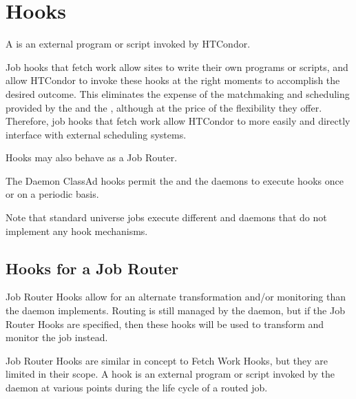 \section{Hooks}\label{sec:hooks}
A  is an external program or script invoked by HTCondor.

Job hooks that fetch work allow sites to write their own programs or scripts, 
and allow HTCondor to invoke these hooks at the right moments 
to accomplish the desired outcome.
This eliminates the expense of the matchmaking and scheduling provided 
by the  and the ,
although at the price of the flexibility they offer. 
Therefore, job hooks that fetch work allow HTCondor to more easily and directly
interface with external scheduling systems. 

Hooks may also behave as a Job Router.

The Daemon ClassAd hooks permit the  and 
the  daemons to execute hooks once or on a periodic basis.

Note that standard universe jobs execute different  and
 daemons that do not implement any hook mechanisms.




\subsection{\label{sec:job-hooks-JR-overview}
Hooks for a Job Router}

Job Router Hooks allow for an alternate transformation and/or 
monitoring than the  daemon implements.
Routing is still managed by the  daemon,
but if the Job Router Hooks are specified,
then these hooks will be used to transform
and monitor the job instead.

Job Router Hooks are similar in concept to Fetch Work Hooks,
but they are limited in their scope.
A hook is an external program or script invoked by the 
daemon at various points during the life cycle of a routed job.

